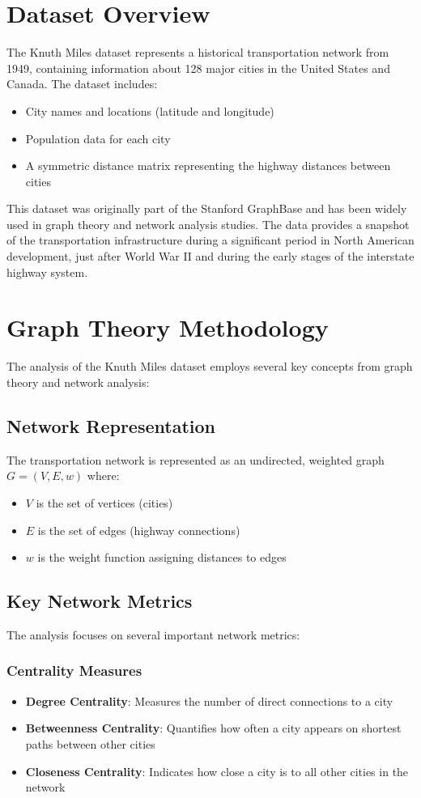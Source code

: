 \section{Dataset Overview}
The Knuth Miles dataset represents a historical transportation network from 1949, containing information about 128 major cities in the United States and Canada. The dataset includes:
\begin{itemize}
    \item City names and locations (latitude and longitude)
    \item Population data for each city
    \item A symmetric distance matrix representing the highway distances between cities
\end{itemize}

This dataset was originally part of the Stanford GraphBase and has been widely used in graph theory and network analysis studies. The data provides a snapshot of the transportation infrastructure during a significant period in North American development, just after World War II and during the early stages of the interstate highway system.

\section{Graph Theory Methodology}
The analysis of the Knuth Miles dataset employs several key concepts from graph theory and network analysis:

\subsection{Network Representation}
The transportation network is represented as an undirected, weighted graph $G = (V, E, w)$ where:
\begin{itemize}
    \item $V$ is the set of vertices (cities)
    \item $E$ is the set of edges (highway connections)
    \item $w$ is the weight function assigning distances to edges
\end{itemize}

\subsection{Key Network Metrics}
The analysis focuses on several important network metrics:

\subsubsection{Centrality Measures}
\begin{itemize}
    \item \textbf{Degree Centrality}: Measures the number of direct connections to a city
    \item \textbf{Betweenness Centrality}: Quantifies how often a city appears on shortest paths between other cities
    \item \textbf{Closeness Centrality}: Indicates how close a city is to all other cities in the network
\end{itemize}

